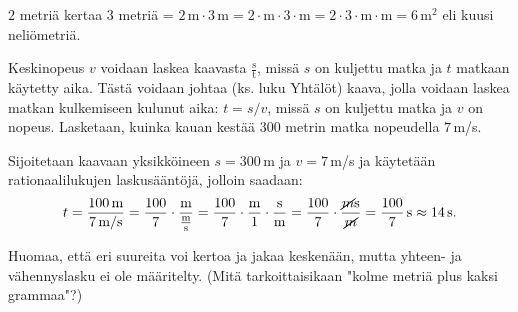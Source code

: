\begin{esimerkki}
$2$ metriä kertaa $3$ metriä = $2\,\text{m} \cdot 3\,\text{m} = 2 \cdot \text{m} \cdot 3 \cdot \text{m}= 2 \cdot 3 \cdot \text{m} \cdot \text{m} =6\,\text{m}^2$ eli kuusi neliömetriä.
\end{esimerkki}

%
%
%	
%

%
%
%	


\begin{esimerkki}
Keskinopeus $v$ voidaan laskea kaavasta $\frac{\text{s}}{\text{t}}$, missä $s$ on kuljettu matka ja $t$ matkaan käytetty aika. Tästä voidaan johtaa (ks. luku Yhtälöt) kaava, jolla voidaan laskea matkan kulkemiseen kulunut aika: $t=s/v$, missä $s$ on kuljettu matka ja $v$ on nopeus. Lasketaan, kuinka kauan kestää $300$ metrin matka nopeudella $7$\,m/s.

Sijoitetaan kaavaan yksikköineen $s=300$\,m ja $v= 7$\,m/s ja käytetään rationaalilukujen laskusääntöjä, jolloin saadaan:
\[t=\frac{100\,\textrm{m}}{7\,\textrm{m/s}} = \frac{100}{7} \cdot \frac{\textrm{m}}{\frac{\textrm{m}}{\textrm{s}}} 
= \frac{100}{7} \cdot \frac{\textrm{m}}{1} \cdot \frac{\textrm{s}}{\textrm{m}}
= \frac{100}{7} \cdot \frac{\cancel{m}\textrm{s}}{\cancel{m}}
=\frac{100}{7}\,\textrm{s} \approx 14\,\textrm{s}.\]
\end{esimerkki}




Huomaa, että eri suureita voi kertoa ja jakaa keskenään, mutta yhteen- ja vähennyslasku ei ole määritelty. (Mitä tarkoittaisikaan "kolme metriä plus kaksi grammaa"?)